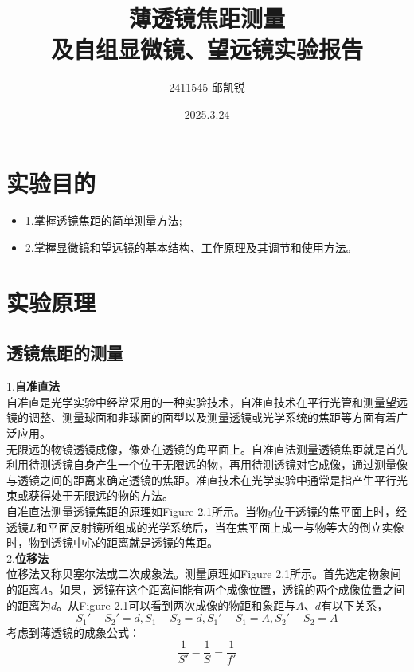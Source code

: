 \documentclass{article}
\title{薄透镜焦距测量\\及自组显微镜、望远镜实验报告}
\author{2411545 邱凯锐}
\date{2025.3.24}
\begin{document}
\maketitle
\section{实验目的}
\begin{itemize}
    \item 1.掌握透镜焦距的简单测量方法;
    \item 2.掌握显微镜和望远镜的基本结构、工作原理及其调节和使用方法。
\end{itemize}
\section{实验原理}
\subsection{透镜焦距的测量}
1.\textbf{自准直法}\\
\hspace*{2em}自准直是光学实验中经常采用的一种实验技术，自准直技术在平行光管和测量望远镜的调整、测量球面和非球面的面型以及测量透镜或光学系统的焦距等方面有着广泛应用。\\
\hspace*{2em}无限远的物镜透镜成像，像处在透镜的角平面上。自准直法测量透镜焦距就是首先利用待测透镜自身产生一个位于无限远的物，再用待测透镜对它成像，通过测量像与透镜之间的距离来确定透镜的焦距。准直技术在光学实验中通常是指产生平行光束或获得处于无限远的物的方法。\\
\hspace*{2em}自准直法测量透镜焦距的原理如Figure 2.1所示。当物\(y\)位于透镜的焦平面上时，经透镜\(L\)和平面反射镜所组成的光学系统后，当在焦平面上成一与物等大的倒立实像时，物到透镜中心的距离就是透镜的焦距。
\\
2.\textbf{位移法}\\
\hspace*{2em}位移法又称贝塞尔法或二次成象法。测量原理如Figure 2.1所示。首先选定物象间的距离\(A\)。如果，透镜在这个距离间能有两个成像位置，透镜的两个成像位置之间的距离为\(d\)。从Figure 2.1可以看到两次成像的物距和象距与\(A\)、\(d\)有以下关系，
\begin{equation}
    S_1'-S_2'=d, S_1-S_2=d,S_1'-S_1=A,S_2'-S_2=A
\end{equation}
考虑到薄透镜的成象公式：
\begin{equation}
    \frac{1}{S'}-\frac{1}{S}=\frac{1}{f'}
\end{equation}
\end{document}
